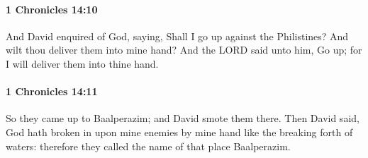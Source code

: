 		\paragraph{1 Chronicles 14:10} %
			\label{1CHRONICLES-14-10}

			And David enquired of God, saying, Shall I go up against the Philistines? And wilt thou deliver them into mine hand? And the LORD said unto him, Go up; for I will deliver them into thine hand.


		\paragraph{1 Chronicles 14:11} %
			\label{1CHRONICLES-14-11}

			So they came up to Baalperazim; and David smote them there. Then David said, God hath broken in upon mine enemies by mine hand like the breaking forth of waters: therefore they called the name of that place Baalperazim.


